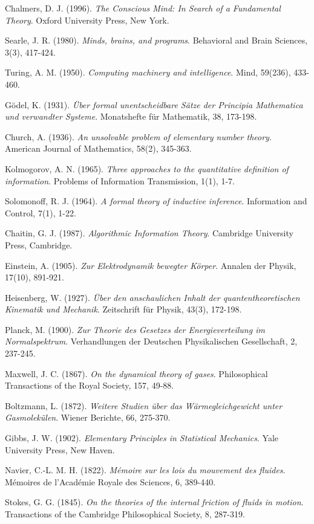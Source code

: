 \documentclass[12pt,a4paper]{article}
\begin{document}
\begin{thebibliography}{99}
Chalmers, D. J. (1996). 
\textit{The Conscious Mind: In Search of a Fundamental Theory}. 
Oxford University Press, New York.

Searle, J. R. (1980). 
\textit{Minds, brains, and programs}. 
Behavioral and Brain Sciences, 3(3), 417-424.

Turing, A. M. (1950). 
\textit{Computing machinery and intelligence}. 
Mind, 59(236), 433-460.

Gödel, K. (1931). 
\textit{Über formal unentscheidbare Sätze der Principia Mathematica und verwandter Systeme}. 
Monatshefte für Mathematik, 38, 173-198.

Church, A. (1936). 
\textit{An unsolvable problem of elementary number theory}. 
American Journal of Mathematics, 58(2), 345-363.

Kolmogorov, A. N. (1965). 
\textit{Three approaches to the quantitative definition of information}. 
Problems of Information Transmission, 1(1), 1-7.

Solomonoff, R. J. (1964). 
\textit{A formal theory of inductive inference}. 
Information and Control, 7(1), 1-22.

Chaitin, G. J. (1987). 
\textit{Algorithmic Information Theory}. 
Cambridge University Press, Cambridge.

Einstein, A. (1905). 
\textit{Zur Elektrodynamik bewegter Körper}. 
Annalen der Physik, 17(10), 891-921.

Heisenberg, W. (1927). 
\textit{Über den anschaulichen Inhalt der quantentheoretischen Kinematik und Mechanik}. 
Zeitschrift für Physik, 43(3), 172-198.

Planck, M. (1900). 
\textit{Zur Theorie des Gesetzes der Energieverteilung im Normalspektrum}. 
Verhandlungen der Deutschen Physikalischen Gesellschaft, 2, 237-245.

Maxwell, J. C. (1867). 
\textit{On the dynamical theory of gases}. 
Philosophical Transactions of the Royal Society, 157, 49-88.

Boltzmann, L. (1872). 
\textit{Weitere Studien über das Wärmegleichgewicht unter Gasmolekülen}. 
Wiener Berichte, 66, 275-370.

Gibbs, J. W. (1902). 
\textit{Elementary Principles in Statistical Mechanics}. 
Yale University Press, New Haven.

Navier, C.-L. M. H. (1822). 
\textit{Mémoire sur les lois du mouvement des fluides}. 
Mémoires de l'Académie Royale des Sciences, 6, 389-440.

Stokes, G. G. (1845). 
\textit{On the theories of the internal friction of fluids in motion}. 
Transactions of the Cambridge Philosophical Society, 8, 287-319.

\end{thebibliography}
\end{document}
